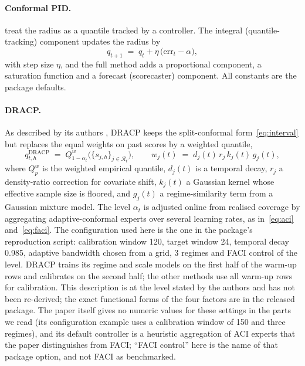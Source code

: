 \paragraph{Conformal PID.} \citet{angelopoulos2023pid} treat the radius as a quantile tracked by a controller. The integral (quantile-tracking) component updates the radius by
\begin{equation}\label{eq:pid}
q_{t+1} \;=\; q_t + \eta\,\bigl(\mathrm{err}_t-\alpha\bigr),
\end{equation}
with step size $\eta$, and the full method adds a proportional component, a saturation function and a forecast (scorecaster) component. All constants are the package defaults.

\paragraph{DRACP.} As described by its authors \citep{oancea2026dracp}, DRACP keeps the split-conformal form~\eqref{eq:interval} but replaces the equal weights on past scores by a weighted quantile,
\begin{equation}\label{eq:dracp}
q^{\mathrm{DRACP}}_{t,h} \;=\; Q^{w}_{1-\alpha_t}\bigl(\{s_{j,h}\}_{j\in\mathcal R_t}\bigr),\qquad
w_j(t) \;=\; d_j(t)\,r_j\,k_j(t)\,g_j(t),
\end{equation}
where $Q^{w}_{p}$ is the weighted empirical quantile, $d_j(t)$ is a temporal decay, $r_j$ a density-ratio correction for covariate shift, $k_j(t)$ a Gaussian kernel whose effective sample size is floored, and $g_j(t)$ a regime-similarity term from a Gaussian mixture model. The level $\alpha_t$ is adjusted online from realised coverage by aggregating adaptive-conformal experts over several learning rates, as in~\eqref{eq:aci} and~\eqref{eq:faci}. The configuration used here is the one in the package's reproduction script: calibration window 120, target window 24, temporal decay 0.985, adaptive bandwidth chosen from a grid, 3 regimes and FACI control of the level. DRACP trains its regime and scale models on the first half of the warm-up rows and calibrates on the second half; the other methods use all warm-up rows for calibration. This description is at the level stated by the authors and has not been re-derived; the exact functional forms of the four factors are in the released package. The paper itself gives no numeric values for these settings in the parts we read (its configuration example uses a calibration window of 150 and three regimes), and its default controller is a heuristic aggregation of ACI experts that the paper distinguishes from FACI; ``FACI control'' here is the name of that package option, and not FACI as benchmarked.

